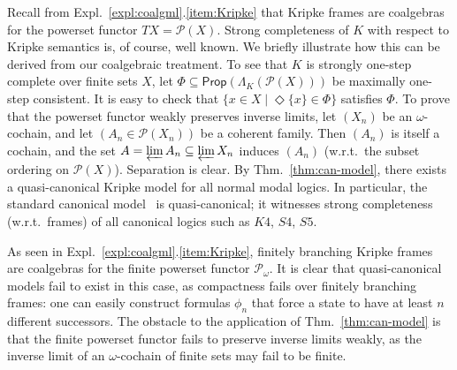 \documentclass[proceedings]{stacs}
\theoremstyle{definition}
\theoremstyle{plain}
\newcommand{\Pow}{\mathcal{P}}
\newcommand{\Prop}{\mathsf{Prop}}
\newcommand{\invlim}{\varprojlim}
\begin{document}
\begin{exa}
Recall from Expl.~\ref{expl:coalgml}.\ref{item:Kripke} that Kripke
  frames are coalgebras for the powerset functor $TX = \Pow(X)$.
  Strong completeness of $K$ with respect to Kripke semantics is, of
  course, well known.  We briefly illustrate how this can be derived
  from our coalgebraic treatment.  To see that $K$ is strongly
  one-step complete over finite sets $X$, let
  $\Phi\subseteq\Prop(\Lambda_K(\Pow(X)))$ be maximally one-step
  consistent. It is easy to check that $\{x\in
  X\mid\Diamond\{x\}\in\Phi\}$ satisfies $\Phi$.  To prove that the
  powerset functor weakly preserves inverse limits, let $(X_n)$ be an
  $\omega$-cochain, and let $(A_n\in\Pow(X_n))$ be a coherent
  family. Then $(A_n)$ is itself a cochain, and the set $A=\invlim
  A_n\subseteq\invlim X_n$ induces $(A_n)$ (w.r.t.\ the subset
  ordering on $\Pow(X)$). Separation is clear. By
  Thm.~\ref{thm:can-model}, there exists a quasi-canonical Kripke
  model for all normal modal logics.  In particular, the standard
  canonical model~\cite{Chellas80} is quasi-canonical; it witnesses
  strong completeness (w.r.t.\ frames) of all canonical logics such as
  $K4$, $S4$, $S5$.
\end{exa}

\begin{exa}
As seen in Expl.~\ref{expl:coalgml}.\ref{item:Kripke}, finitely
branching Kripke frames are coalgebras for the finite powerset functor
$\Pow_\omega$. It is clear that quasi-canonical models fail to exist
in this case, as compactness fails over finitely branching frames: one
can easily construct formulas $\phi_n$ that force a state to have at
least $n$ different successors.  The obstacle to the application of
Thm.~\ref{thm:can-model} is that the finite powerset functor fails to
preserve inverse limits weakly, as the inverse limit of an
$\omega$-cochain of finite sets may fail to be finite.
\end{exa}
\end{document}
